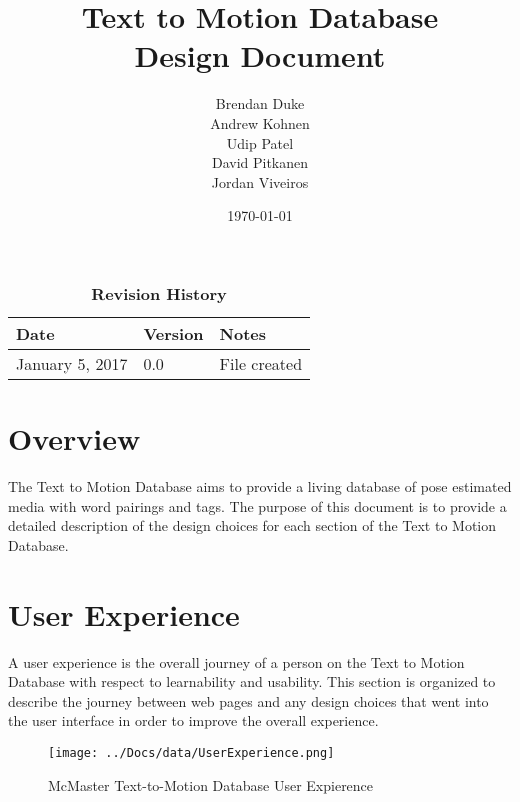 \documentclass{scrreprt}
\begin{document}
\title{\bf Text to Motion Database\\[\baselineskip]\Large Design Document}
\author{Brendan Duke\\Andrew Kohnen\\Udip Patel\\David Pitkanen\\Jordan Viveiros}
\date{\today}

\maketitle

\tableofcontents


\begin{table}[bp]
\caption*{\bf Revision History}
\begin{tabularx}{\textwidth}{p{3.5cm}p{2cm}X}
\toprule {\bf Date} & {\bf Version} & {\bf Notes}\\
\midrule
January 5, 2017 & 0.0 & File created\\
\bottomrule
\end{tabularx}
\end{table}

\newpage


\chapter{Overview}
The Text to Motion Database aims to provide a living database of pose estimated media with word pairings and tags. The purpose of this document is to provide a detailed description of the design choices for each section of the Text to Motion Database.

\chapter{User Experience}
A user experience is the overall journey of a person on the Text to Motion Database with respect to learnability and usability. This section is organized to describe the journey between web pages and any design choices that went into the user interface in order to improve the overall experience.

\begin{figure}[!ht]
        \caption{McMaster Text-to-Motion Database User Expierence}
        \label{userExp}
        \centering
        \texttt{[image: ../Docs/data/UserExperience.png]}
\end{figure}
\end{document}
